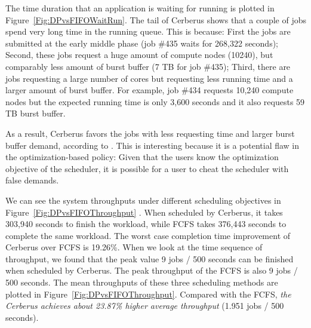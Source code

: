 The time duration that an application is waiting for running
is plotted in Figure~\ref{Fig:DPvsFIFOWaitRun}.
The tail of Cerberus shows that a couple of jobs
spend very long time in the running queue.
This is because: First the jobs are submitted at the early middle phase
(job \#435 waits for 268,322 seconds); Second, these jobs request a huge
amount of compute nodes (10240), but comparably less amount of burst buffer (7 TB for job \#435);
Third, there are jobs requesting a large number of cores but requesting
less running time and a larger amount of burst buffer.
For example, job \#434 requests 10,240 compute nodes but the expected running time
is only 3,600 seconds and it also requests 59 TB burst buffer.

As a result, Cerberus favors the jobs with less requesting time and larger burst buffer demand,
according to .
This is interesting because it is a potential flaw in the optimization-based policy:
Given that the users know the optimization objective of the scheduler,
it is possible for a user to cheat the scheduler with false demands.


We can see the system throughputs under different scheduling objectives in Figure~\ref{Fig:DPvsFIFOThroughput} .
When scheduled by Cerberus, it takes 303,940 seconds to finish the workload,
while FCFS takes 376,443 seconds to complete the same workload.
The worst case completion time improvement of Cerberus over FCFS is 19.26\%.
When we look at the time sequence of throughput,
we found that the peak value 9 jobs / 500 seconds can be finished when scheduled by Cerberus.
The peak throughput of the FCFS is also 9 jobs / 500 seconds.
The mean throughputs of these three scheduling methods are plotted in Figure~\ref{Fig:DPvsFIFOThroughput}.
Compared with the FCFS, \textit{the Cerberus achieves about 23.87\% higher average throughput}
(1.951 jobs / 500 seconds).



